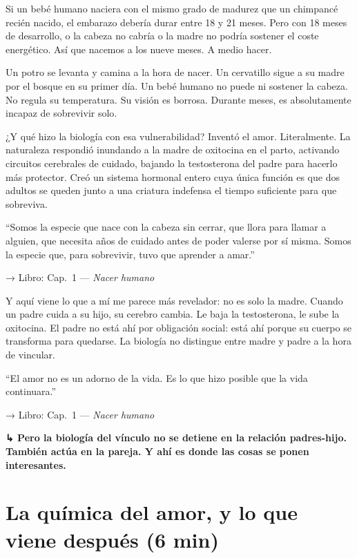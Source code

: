 \documentclass[a4paper, 11pt]{article}
\newcommand{\reflibro}[1]{%
  {\small\sffamily\color{gris} → Libro: #1}%
}
\newcommand{\transicion}[1]{%
  \par\medskip
  {\sffamily\color{gris}\bfseries ↳ #1}%
  \par\medskip
}
\begin{document}
Si un bebé humano naciera con el mismo grado de madurez que un chimpancé recién nacido, el embarazo debería durar entre 18 y 21 meses. Pero con 18 meses de desarrollo, o la cabeza no cabría o la madre no podría sostener el coste energético. Así que nacemos a los nueve meses. A medio hacer.

Un potro se levanta y camina a la hora de nacer. Un cervatillo sigue a su madre por el bosque en su primer día. Un bebé humano no puede ni sostener la cabeza. No regula su temperatura. Su visión es borrosa. Durante meses, es absolutamente incapaz de sobrevivir solo.

¿Y qué hizo la biología con esa vulnerabilidad? Inventó el amor. Literalmente. La naturaleza respondió inundando a la madre de oxitocina en el parto, activando circuitos cerebrales de cuidado, bajando la testosterona del padre para hacerlo más protector. Creó un sistema hormonal entero cuya única función es que dos adultos se queden junto a una criatura indefensa el tiempo suficiente para que sobreviva.

\begin{citalibro}
``Somos la especie que nace con la cabeza sin cerrar, que llora para llamar a alguien, que necesita años de cuidado antes de poder valerse por sí misma. Somos la especie que, para sobrevivir, tuvo que aprender a amar.''
\end{citalibro}
\reflibro{Cap.\ 1 — \emph{Nacer humano}}

Y aquí viene lo que a mí me parece más revelador: no es solo la madre. Cuando un padre cuida a su hijo, su cerebro cambia. Le baja la testosterona, le sube la oxitocina. El padre no está ahí por obligación social: está ahí porque su cuerpo se transforma para quedarse. La biología no distingue entre madre y padre a la hora de vincular.

\begin{citalibro}
``El amor no es un adorno de la vida. Es lo que hizo posible que la vida continuara.''
\end{citalibro}
\reflibro{Cap.\ 1 — \emph{Nacer humano}}

\transicion{Pero la biología del vínculo no se detiene en la relación padres-hijo. También actúa en la pareja. Y ahí es donde las cosas se ponen interesantes.}

\section{La química del amor, y lo que viene después (6 min)}
\end{document}
